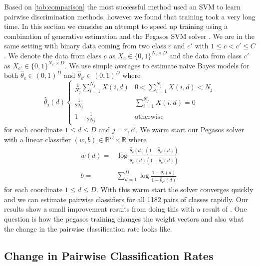 \documentclass{article}
\begin{document}
Based on \autoref{tab:comparison} the most successful method
used an SVM to learn pairwise discrimination methods, however we
found that training took a very long time.  In this section
we consider an attempt to speed up training using a combination
of generative estimation and the Pegasos SVM solver \cite{pegasos}.
We are in the same setting with binary data coming from two class
$c$ and $c'$ with $1\leq c<c'\leq C$. We denote the data
from class $c$ as $X_c\in \{0,1\}^{N_c\times D}$ and
the data from class $c'$ as $X_{c'}\in \{0,1\}^{N_{c'}\times D}$.
We use simple averages to estimate naive Bayes models for
both $\hat{\theta}_c \in (0,1)^D$ and $\hat{\theta}_{c'}\in(0,1)^D$ where
\begin{equation}
\hat{\theta}_j(d) \begin{cases}
\frac{1}{N_j} \sum_{i=1}^{N_j} X(i,d) &  0 < \sum_{i=1}^{N_j} X(i,d) < N_j\\
\frac{1}{2N_j} & \sum_{i=1}^{N_j} X(i,d) = 0\\
1 - \frac{1}{2N_j} & \text{otherwise}
\end{cases}
\end{equation}
for each coordinate $1\leq d\leq D$ and $j=c,c'$. We warm start
our Pegasos solver with a linear classifier $(w,b)\in\mathbb{R}^D\times \mathbb{R}$ where
\begin{align}
w(d) =& \log \frac{\hat{\theta}_c(d)(1-\hat{\theta}_{c'}(d))}{\hat{\theta}_{c'}(d)(1-\hat{\theta}_{c}(d))}\\
b =& \sum_{d=1}^D \log \frac{1-\hat{\theta}_c(d)}{1-\hat{\theta}_{c'}(d)}
\end{align} 
for each coordinate $1\leq d\leq D$.  With this warm start
the solver converges quickly and we can estimate pairwise classifiers
for all 1182 pairs of classes rapidly.  Our results show a small improvement results from doing this with a result of .  One question is
how the pegasos training changes the weight vectors and also
what the change in the pairwise classification rate looks like.

\subsection{Change in Pairwise Classification Rates}
\end{document}
